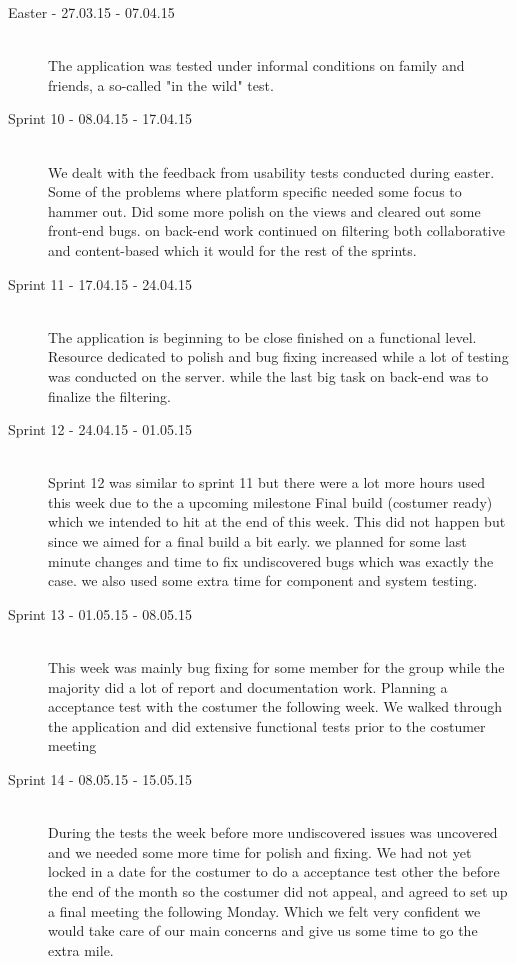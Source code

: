 \begin{description}
	\item[Easter - 27.03.15 - 07.04.15] \hfill \\ 
	The application was tested under informal conditions on family and friends, a so-called "in the wild" test.
	
	\item[Sprint 10 - 08.04.15 - 17.04.15] \hfill \\ 
	We dealt with the feedback from usability tests conducted during easter. Some of the problems where platform specific needed some focus to hammer out. Did some more polish on the views and cleared out some front-end bugs. on back-end work continued on filtering both collaborative and content-based which it would for the rest of the sprints. 

	\item[Sprint 11 - 17.04.15 - 24.04.15] \hfill \\ 
	The application is beginning to be close finished on a functional level. Resource dedicated to polish and bug fixing increased while a lot of testing was conducted on the server. while the last big task on back-end was to finalize the filtering.

	\item[Sprint 12 - 24.04.15 - 01.05.15] \hfill \\ 
	Sprint 12 was similar to sprint 11 but there were a lot more hours used this week due to the a upcoming milestone Final build (costumer ready) which we intended to hit at the end of this week. This did not happen but since we aimed for a final build a bit early. we planned for some last minute changes and time to fix undiscovered bugs which was exactly the case. we also used some extra time for component and system testing.
	
	\item[Sprint 13 - 01.05.15 - 08.05.15] \hfill \\ 
	This week was mainly bug fixing for some member for the group while the majority did a lot of report and documentation work. Planning a acceptance test with the costumer the following week. We walked through the application and did extensive functional tests prior to the costumer meeting 

	\item[Sprint 14 - 08.05.15 - 15.05.15] \hfill \\ 
	During the tests the week before more undiscovered issues was uncovered and we needed some more time for polish and fixing. We had not yet locked in a date for the costumer to do a acceptance test other the before the end of the month so the costumer did not appeal, and agreed to set up a final meeting the following Monday. Which we felt very confident we would take care of our main concerns and give us some time to go the extra mile.
	

\end{description}
